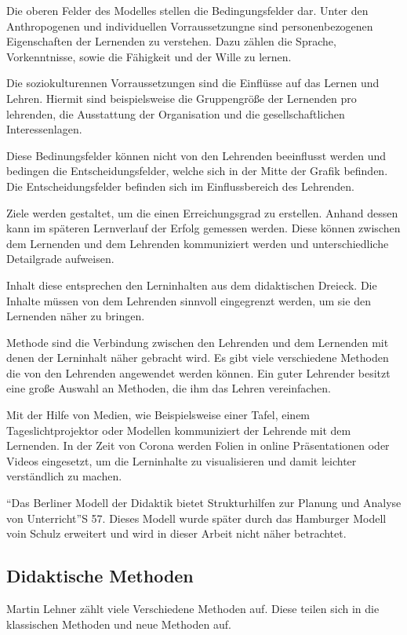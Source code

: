 Die oberen Felder des Modelles stellen die Bedingungsfelder dar. Unter den Anthropogenen und individuellen Vorraussetzungne sind personenbezogenen Eigenschaften der Lernenden zu verstehen. Dazu zählen die Sprache, Vorkenntnisse, sowie die Fähigkeit und der Wille zu lernen. 

Die soziokulturennen Vorraussetzungen sind die Einflüsse auf das Lernen und Lehren. Hiermit sind beispielsweise die Gruppengröße der Lernenden pro lehrenden, die Ausstattung der Organisation und die gesellschaftlichen Interessenlagen. 

Diese Bedinungsfelder können nicht von den Lehrenden beeinflusst werden und bedingen die Entscheidungsfelder, welche sich in der Mitte der Grafik befinden. Die Entscheidungsfelder befinden sich im Einflussbereich des Lehrenden.

Ziele werden gestaltet, um die einen Erreichungsgrad zu erstellen. Anhand dessen kann im späteren Lernverlauf der Erfolg gemessen werden. Diese können zwischen dem Lernenden und dem Lehrenden kommuniziert werden und unterschiedliche Detailgrade aufweisen. 

Inhalt diese entsprechen den Lerninhalten aus dem didaktischen Dreieck. Die Inhalte müssen von dem Lehrenden sinnvoll eingegrenzt werden, um sie den Lernenden näher zu bringen. 

Methode sind die Verbindung zwischen den Lehrenden und dem Lernenden mit denen der Lerninhalt näher gebracht wird. Es gibt viele verschiedene Methoden die von den Lehrenden angewendet werden können. Ein guter Lehrender besitzt eine große Auswahl an Methoden, die ihm das Lehren vereinfachen.

Mit der Hilfe von Medien, wie Beispielsweise einer Tafel, einem Tageslichtprojektor oder Modellen kommuniziert der Lehrende mit dem Lernenden. In der Zeit von Corona werden Folien in online Präsentationen oder Videos eingesetzt, um die Lerninhalte zu visualisieren und damit leichter verständlich zu machen. 

\enquote{Das Berliner Modell der Didaktik bietet Strukturhilfen zur Planung und Analyse von Unterricht}S 57. Dieses Modell wurde später durch das Hamburger Modell voin Schulz erweitert und wird in dieser Arbeit nicht näher betrachtet.

\subsection{Didaktische Methoden}
 Martin Lehner zählt viele Verschiedene Methoden auf. Diese teilen sich in die klassischen Methoden und neue Methoden auf.

